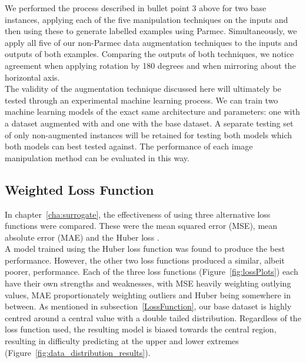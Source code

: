 \noindent
We performed the process described in bullet point 3 above for two base instances, applying each of the five manipulation techniques on the inputs and then using these to generate labelled examples using Parmec. Simultaneously, we apply all five of our non-Parmec data augmentation techniques to the inputs and outputs of both examples. Comparing the outputs of both techniques, we notice agreement when applying rotation by 180 degrees and when mirroring about the horizontal axis. 
\\

\noindent
The validity of the augmentation technique discussed here will ultimately be tested through an experimental machine learning process. We can train two machine learning models of the exact same architecture and parameters: one with a dataset augmented with and one with the base dataset. A separate testing set of only non-augmented instances will be retained for testing both models which both models can best tested against. The performance of each image manipulation method can be evaluated in this way. 





\subsection{Weighted Loss Function} \label{Weighted}

In chapter~\ref{cha:surrogate}, the effectiveness of using three alternative loss functions were compared. These were the mean squared error (MSE), mean absolute error (MAE) and the Huber loss \cite{huber1964robust}.
\\

\noindent
A model trained using the Huber loss function was found to produce the best performance. However, the other two loss functions produced a similar, albeit poorer, performance. Each of the three loss functions (Figure~\ref{fig:lossPlots}) each have their own strengths and weaknesses, with MSE heavily weighting outlying values, MAE proportionately weighting outliers and Huber being somewhere in between. As mentioned in subsection~\ref{LossFunction}, our base dataset is highly centred around a central value with a double tailed distribution. Regardless of the loss function used, the resulting model is biased towards the central region, resulting in difficulty predicting at the upper and lower extremes (Figure~\ref{fig:data_distribution_results}). 
\\

